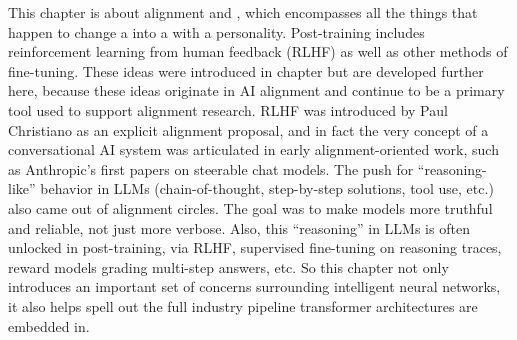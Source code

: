 
This chapter is about alignment and , which encompasses all the things that happen to change a  into a  with a personality. Post-training includes reinforcement learning from human feedback (RLHF) as well as other methods of fine-tuning. These ideas were introduced in chapter  but are developed further here, because these ideas originate in AI alignment and continue to be a primary tool used to support alignment research. RLHF was introduced by Paul Christiano as an explicit alignment proposal, and in fact the very concept of a conversational AI system was articulated in early alignment-oriented work, such as Anthropic’s first papers on steerable chat models. The push for ``reasoning-like'' behavior in LLMs (chain-of-thought, step-by-step solutions, tool use, etc.) also came out of alignment circles. The goal was to make models more truthful and reliable, not just more verbose. Also, this “reasoning” in LLMs is often unlocked in post-training, via RLHF, supervised fine-tuning on reasoning traces, reward models grading multi-step answers, etc. So this chapter not only introduces an important set of concerns surrounding intelligent neural networks, it also helps spell out the full industry pipeline transformer architectures are embedded in.

